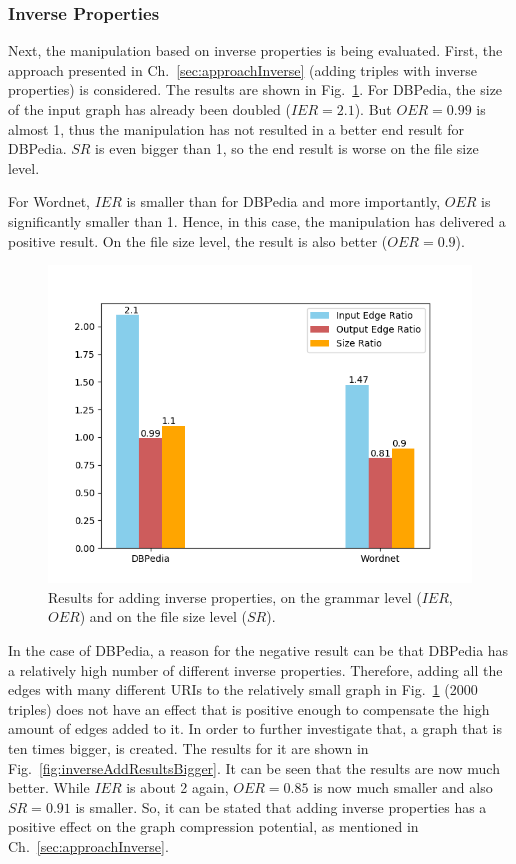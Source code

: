 \subsubsection{Inverse Properties}

Next, the manipulation based on inverse properties is being evaluated. First, the approach presented in Ch.~\ref{sec:approachInverse} (adding triples with inverse properties) is considered. The results are shown in Fig.~\ref{fig:inverseAddResults}. For DBPedia, the size of the input graph has already been doubled ($IER=2.1$). But $OER=0.99$ is almost 1, thus the manipulation has not resulted in a better end result for DBPedia. $SR$ is even bigger than 1, so the end result is worse on the file size level.

For Wordnet, $IER$ is smaller than for DBPedia and more importantly, $OER$ is significantly smaller than 1. Hence, in this case, the manipulation has delivered a positive result. On the file size level, the result is also better ($OER=0.9$).

\begin{figure}
	\centering
	\includegraphics[width=0.8\linewidth]{figures/4_evaluation/ontology/ratiosInverseAdd}
	\caption{Results for adding inverse properties, on the grammar level ($IER$, $OER$) and on the file size level ($SR$).}
	\label{fig:inverseAddResults}
\end{figure}

In the case of DBPedia, a reason for the negative result can be that DBPedia has a relatively high number of different inverse properties. Therefore, adding all the edges with many different URIs to the relatively small graph in Fig.~\ref{fig:inverseAddResults} (2000 triples) does not have an effect that is positive enough to compensate the high amount of edges added to it. In order to further investigate that, a graph that is ten times bigger, is created. The results for it are shown in Fig.~\ref{fig:inverseAddResultsBigger}. It can be seen that the results are now much better. While $IER$ is about 2 again, $OER=0.85$ is now much smaller and also $SR=0.91$ is smaller. So, it can be stated that adding inverse properties has a positive effect on the graph compression potential, as mentioned in Ch.~\ref{sec:approachInverse}.

